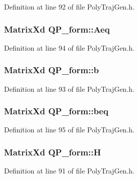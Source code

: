 Definition at line 92 of file Poly\+Traj\+Gen.\+h.

\subsubsection[{\texorpdfstring{Aeq}{Aeq}}]{\setlength{\rightskip}{0pt plus 5cm}Matrix\+Xd Q\+P\+\_\+form\+::\+Aeq}\hypertarget{struct_q_p__form_af0fab4bf47d9b4a2598445bd11f446e0}{}\label{struct_q_p__form_af0fab4bf47d9b4a2598445bd11f446e0}


Definition at line 94 of file Poly\+Traj\+Gen.\+h.

\subsubsection[{\texorpdfstring{b}{b}}]{\setlength{\rightskip}{0pt plus 5cm}Matrix\+Xd Q\+P\+\_\+form\+::b}\hypertarget{struct_q_p__form_a949cd1a76929ca7aeb61c8955da4a1a2}{}\label{struct_q_p__form_a949cd1a76929ca7aeb61c8955da4a1a2}


Definition at line 93 of file Poly\+Traj\+Gen.\+h.

\subsubsection[{\texorpdfstring{beq}{beq}}]{\setlength{\rightskip}{0pt plus 5cm}Matrix\+Xd Q\+P\+\_\+form\+::beq}\hypertarget{struct_q_p__form_a3671f01cebe0e9acdb6ce105b6eff780}{}\label{struct_q_p__form_a3671f01cebe0e9acdb6ce105b6eff780}


Definition at line 95 of file Poly\+Traj\+Gen.\+h.

\subsubsection[{\texorpdfstring{H}{H}}]{\setlength{\rightskip}{0pt plus 5cm}Matrix\+Xd Q\+P\+\_\+form\+::H}\hypertarget{struct_q_p__form_ac8ff933f268484b2f78b77ffc056f11d}{}\label{struct_q_p__form_ac8ff933f268484b2f78b77ffc056f11d}


Definition at line 91 of file Poly\+Traj\+Gen.\+h.

